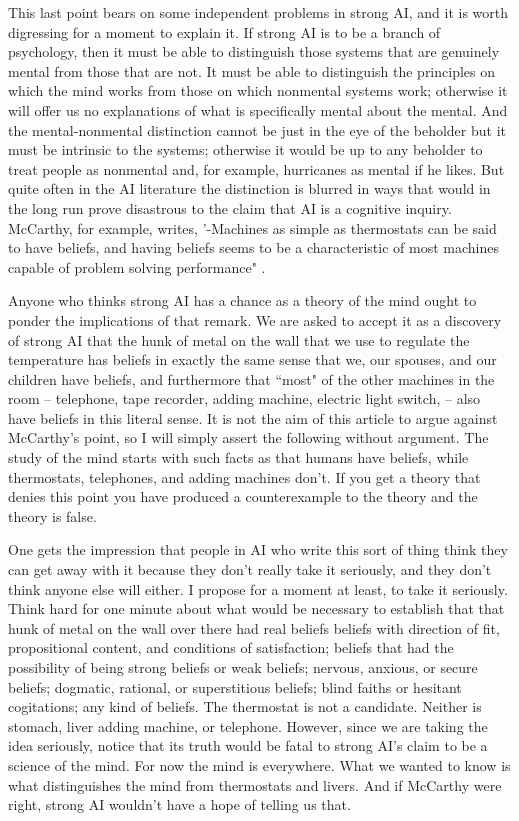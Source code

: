 This last point bears on some independent problems in strong AI, and it is worth digressing for a moment to
explain it. If strong AI is to be a branch of psychology, then it must be able to distinguish those systems that are
genuinely mental from those that are not. It must be able to distinguish the principles on which the mind works
from those on which nonmental systems work; otherwise it will offer us no explanations of what is specifically
mental about the mental. And the mental-nonmental distinction cannot be just in the eye of the beholder but it
must be intrinsic to the systems; otherwise it would be up to any beholder to treat people as nonmental and, for
example, hurricanes as mental if he likes. But quite often in the AI literature the distinction is blurred in ways
that would in the long run prove disastrous to the claim that AI is a cognitive inquiry. McCarthy, for example,
writes, '-Machines as simple as thermostats can be said to have beliefs, and having beliefs seems to be a
characteristic of most machines capable of problem solving performance" \autocite{McCarthy1}.

Anyone who thinks strong AI has a chance as a theory of the mind ought to ponder the implications of that
remark. We are asked to accept it as a discovery of strong AI that the hunk of metal on the wall that we use to
regulate the temperature has beliefs in exactly the same sense that we, our spouses, and our children have
beliefs, and furthermore that ``most" of the other machines in the room -- telephone, tape recorder, adding
machine, electric light switch, -- also have beliefs in this literal sense. It is not the aim of this article to argue
against McCarthy's point, so I will simply assert the following without argument. The study of the mind starts
with such facts as that humans have beliefs, while thermostats, telephones, and adding machines don't. If you get
a theory that denies this point you have produced a counterexample to the theory and the theory is false.

One gets the impression that people in AI who write this sort of thing think they can get away with it because
they don't really take it seriously, and they don't think anyone else will either. I propose for a moment at least, to
take it seriously. Think hard for one minute about what would be necessary to establish that that hunk of metal
on the wall over there had real beliefs beliefs with direction of fit, propositional content, and conditions of
satisfaction; beliefs that had the possibility of being strong beliefs or weak beliefs; nervous, anxious, or secure
beliefs; dogmatic, rational, or superstitious beliefs; blind faiths or hesitant cogitations; any kind of beliefs. The
thermostat is not a candidate. Neither is stomach, liver adding machine, or telephone. However, since we are
taking the idea seriously, notice that its truth would be fatal to strong AI's claim to be a science of the mind. For
now the mind is everywhere. What we wanted to know is what distinguishes the mind from thermostats and
livers. And if McCarthy were right, strong AI wouldn't have a hope of telling us that.

